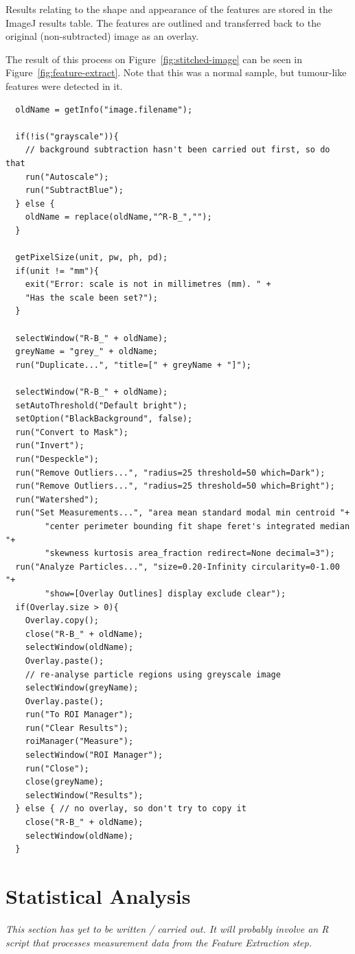 \documentclass[a4paper]{scrartcl}
\begin{document}
Results relating to the shape and appearance of the features are
stored in the ImageJ results table. The features are outlined and
transferred back to the original (non-subtracted) image as an overlay.

The result of this process on Figure~\ref{fig:stitched-image} can be
seen in Figure~\ref{fig:feature-extract}. Note that this was a normal
sample, but tumour-like features were detected in it.

\begin{Verbatim}
  oldName = getInfo("image.filename");

  if(!is("grayscale")){
    // background subtraction hasn't been carried out first, so do that
    run("Autoscale");
    run("SubtractBlue");
  } else {
    oldName = replace(oldName,"^R-B_","");
  }

  getPixelSize(unit, pw, ph, pd);
  if(unit != "mm"){
    exit("Error: scale is not in millimetres (mm). " +
    "Has the scale been set?");
  }

  selectWindow("R-B_" + oldName);
  greyName = "grey_" + oldName;
  run("Duplicate...", "title=[" + greyName + "]");

  selectWindow("R-B_" + oldName);
  setAutoThreshold("Default bright");
  setOption("BlackBackground", false);
  run("Convert to Mask");
  run("Invert");
  run("Despeckle");
  run("Remove Outliers...", "radius=25 threshold=50 which=Dark");
  run("Remove Outliers...", "radius=25 threshold=50 which=Bright");
  run("Watershed");
  run("Set Measurements...", "area mean standard modal min centroid "+
        "center perimeter bounding fit shape feret's integrated median "+
        "skewness kurtosis area_fraction redirect=None decimal=3");
  run("Analyze Particles...", "size=0.20-Infinity circularity=0-1.00 "+
        "show=[Overlay Outlines] display exclude clear");
  if(Overlay.size > 0){
    Overlay.copy();
    close("R-B_" + oldName);
    selectWindow(oldName);
    Overlay.paste();
    // re-analyse particle regions using greyscale image
    selectWindow(greyName);
    Overlay.paste();
    run("To ROI Manager");
    run("Clear Results");
    roiManager("Measure");
    selectWindow("ROI Manager");
    run("Close");
    close(greyName);
    selectWindow("Results");
  } else { // no overlay, so don't try to copy it
    close("R-B_" + oldName);
    selectWindow(oldName);
  }
\end{Verbatim}

\section{Statistical Analysis}

\emph{This section has yet to be written / carried out. It will
  probably involve an R script that processes measurement data from
  the Feature Extraction step.}
\end{document}

